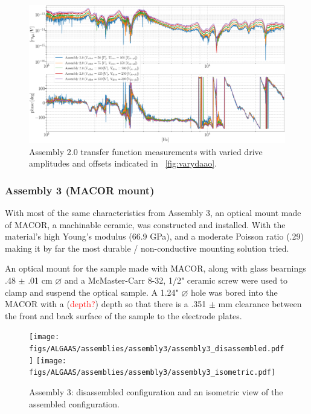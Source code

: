 \begin{figure}[H]
    \includegraphics[width=\textwidth]{figs/ALGAAS/results_figs/assembly2/vvao517.pdf} 
    \caption{Assembly 2.0 transfer function measurements with varied drive amplitudes and offsets indicated in ~\autoref{fig:varydaao}.}
    \label{fig:vvao517}
\end{figure}

\subsubsection{Assembly 3 (MACOR mount)}
With most of the same characteristics from Assembly 3, an optical mount made of MACOR, a machinable ceramic, was constructed and installed. With the material's high Young's modulus (66.9 GPa), and a moderate Poisson ratio (.29) \cite{macor} making it by far the most durable / non-conductive mounting solution tried.

An optical mount for the sample made with MACOR, along with glass bearnings .48 $\pm$ .01 cm $\diameter$  and a McMaster-Carr 8-32, 1/2" ceramic screw were used to clamp and suspend the optical sample. A 1.24" $\diameter$ hole was bored into the MACOR with a (\textcolor{red}{depth?}) depth so that there is a .351 $\pm$ mm clearance between the front and back surface of the sample to the electrode plates.

\begin{figure}[!ht]
    \begin{subcaptiongroup}
	    \texttt{[image: figs/ALGAAS/assemblies/assembly3/assembly3\_disassembled.pdf]}
	    \label{subfig:A3disassembled}
	    \texttt{[image: figs/ALGAAS/assemblies/assembly3/assembly3\_isometric.pdf]}
	    \label{subfig:A3isometric}
    \end{subcaptiongroup}
    \caption{Assembly 3:  disassembled configuration and  an isometric view of the assembled configuration.}
    \label{fig:assembly3}
\end{figure}


